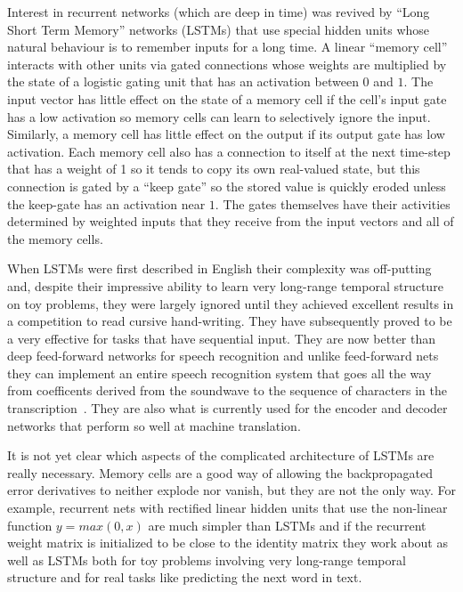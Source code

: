 \documentclass[]{article}
\begin{document}
Interest in recurrent networks (which are deep in time) was revived by
``Long Short Term Memory'' networks (LSTMs) that use special hidden units
whose natural behaviour is to remember inputs for a long
time\cite{Hochreiter}.  A linear ``memory cell'' interacts with other units
via gated connections whose weights are multiplied by the state of a
logistic gating unit that has an activation between $0$ and $1$. The input
vector has little effect on the state of a memory cell if the cell's input
gate has a low activation so memory cells can learn to selectively ignore
the input.  Similarly, a memory cell has little effect on the output if its
output gate has low activation. Each memory cell also has a connection to
itself at the next time-step that has a weight of 1 so it tends to copy its
own real-valued state, but this connection is gated by a ``keep gate'' so
the stored value is quickly eroded unless the keep-gate has an activation
near $1$.  The gates themselves have their activities determined by
weighted inputs that they receive from the input vectors and all of the
memory cells.

When LSTMs were first described in English\cite{HochSchmid} their
complexity was off-putting and, despite their impressive ability to learn
very long-range temporal structure on toy problems, they were largely
ignored until they achieved excellent results in a competition to read
cursive hand-writing\cite{Graves}. They have subsequently proved to be a
very effective for tasks that have sequential input.  They are now better
than deep feed-forward networks for speech recognition\cite{gravestimit}
and unlike feed-forward nets they can implement an entire speech
recognition system that goes all the way from coefficents derived from the
soundwave to the sequence of characters in the transcription~\cite{graves}.
They are also what is currently used for the encoder and decoder networks
that perform so well at machine translation.

It is not yet clear which aspects of the complicated architecture of LSTMs
are really necessary. Memory cells are a good way of allowing the
backpropagated error derivatives to neither explode nor vanish, but they
are not the only way.  For example, recurrent nets with rectified linear
hidden units that use the non-linear function $y=max(0,x)$ are much simpler
than LSTMs and if the recurrent weight matrix is initialized to be close to
the identity matrix they work about as well as LSTMs both for toy problems
involving very long-range temporal structure and for real tasks like
predicting the next word in text\cite{LeHinton}.
\end{document}
